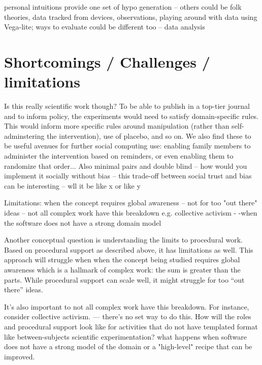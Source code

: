 personal intuitions provide one set of hypo generation -- others could be folk theories, data tracked from devices, observations, playing around with data using Vega-lite; ways to evaluate could be different too -- data analysis



\section{Shortcomings / Challenges / limitations}
Is this really scientific work though? To be able to publish in a top-tier journal and to inform policy, the experiments would need to satisfy domain-specific rules. This would inform more specific rules around manipulation (rather than self-adminstering the intervention), use of placebo, and so on. We also find these to be useful avenues for further social computing use: enabling family members to administer the intervention based on reminders, or even enabling them to randomize that order... 
	Also minimal pairs and double blind -- how would you implement it socially without bias -- this trade-off between social trust and bias can be interesting -- wll it be like x or like y

Limitations: when the concept requires global awareness -- not for too "out there" ideas -- not all complex work have this breakdown e.g. collective activism - -when the software does not have a strong domain model

Another conceptual question is understanding the limits to procedural work. Based on procedural support as described above, it has limitations as well. This approach will struggle when when the concept being studied requires global awareness which is a hallmark of complex work: the sum is greater than the parts.  While procedural support can scale well, it might struggle for too “out there” ideas.

It's also important to not all complex work have this breakdown. For instance, consider collective activism. — there’s no set way to do this. How will the roles and procedural support look like for activities that do not have templated format like between-subjects scientific experimentation?  what happens when software does not have a strong model of the domain or a "high-level" recipe that can be improved.


